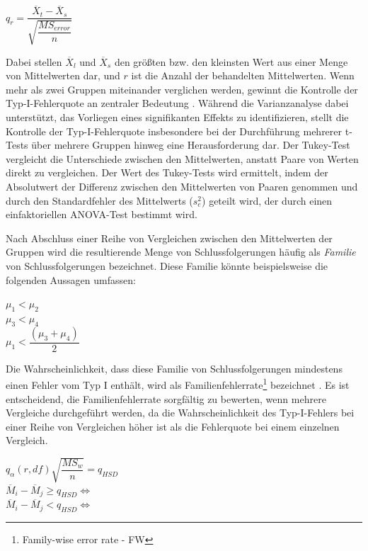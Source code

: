 \begin{center}
  $q_r = \dfrac{\overline{X}_t - \overline{X}_s}{\sqrt{\dfrac{MS_{error}}{n}}}$
\end{center}

Dabei stellen $\overline{X}_l$ und $\overline{X}_s$ den größten bzw. den kleinsten Wert aus einer Menge von Mittelwerten dar, 
und $r$ ist die Anzahl der behandelten Mittelwerten.
Wenn mehr als zwei Gruppen miteinander verglichen werden, gewinnt die Kontrolle der Typ-I-Fehlerquote an zentraler Bedeutung \cite{tukey_HSD}. 
Während die Varianzanalyse dabei unterstützt, das Vorliegen eines signifikanten Effekts zu identifizieren, 
stellt die Kontrolle der Typ-I-Fehlerquote insbesondere bei der Durchführung mehrerer t-Tests über mehrere Gruppen hinweg eine Herausforderung dar.
Der Tukey-Test vergleicht die Unterschiede zwischen den Mittelwerten, 
anstatt Paare von Werten direkt zu vergleichen. Der Wert des Tukey-Tests wird ermittelt, 
indem der Absolutwert der Differenz zwischen den Mittelwerten von Paaren genommen und durch den Standardfehler des Mittelwerts ($s^2_e$) geteilt wird, 
der durch einen einfaktoriellen ANOVA-Test bestimmt wird.

Nach Abschluss einer Reihe von Vergleichen zwischen den Mittelwerten der Gruppen wird die resultierende Menge von Schlussfolgerungen 
häufig als \textit{Familie} von Schlussfolgerungen bezeichnet. Diese Familie könnte beispielsweise die folgenden Aussagen umfassen:

\begin{center}
  $\mu_1 < \mu_2$ \\
  $\mu_3 < \mu_4$ \\
  $\mu_1 < \dfrac{(\mu_3 + \mu_4)}{2}$
\end{center}

Die Wahrscheinlichkeit, dass diese Familie von Schlussfolgerungen mindestens einen Fehler vom Typ I enthält,
wird als Familienfehlerrate\footnote{Family-wise error rate - FW} bezeichnet \cite[S. 365]{tukey_hsd_book}.
Es ist entscheidend, 
die Familienfehlerrate sorgfältig zu bewerten, wenn mehrere Vergleiche durchgeführt werden,
da die Wahrscheinlichkeit des Typ-I-Fehlers
bei einer Reihe von Vergleichen höher ist als die Fehlerquote bei einem einzelnen Vergleich.


\begin{center}
  $q_{\alpha}(r, df){\sqrt{\dfrac{MS_w}{n}}} = q_{HSD}$ \\
  $\overline{M}_i - \overline{M}_j \geq q_{HSD} \iff$  \\
  $\overline{M}_i - \overline{M}_j < q_{HSD} \iff$  
\end{center}

